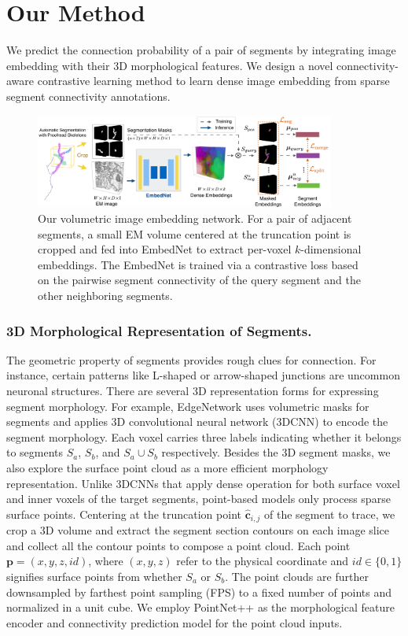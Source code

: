 \section{Our Method}
\label{sec:method}

 
We predict the connection probability of a pair of segments by integrating image embedding with their 3D morphological features. We design a novel connectivity-aware contrastive learning method to learn dense image embedding from sparse segment connectivity annotations.
\begin{figure}[t]
    \centering
    \includegraphics[width=0.88\textwidth]{figs/main.pdf}
    \caption{Our volumetric image embedding network. For a pair of adjacent segments, a small EM volume centered at the truncation point is cropped and fed into EmbedNet to extract per-voxel $k$-dimensional embeddings. The EmbedNet is trained via a contrastive loss based on the pairwise segment connectivity of the query segment and the other neighboring segments.}%
    \label{fig:embedding}
\end{figure}


\subsubsection{3D Morphological Representation of Segments.}
The geometric property of segments provides rough clues for connection. For instance, certain patterns like L-shaped or arrow-shaped junctions are uncommon neuronal structures. 
There are several 3D representation forms for expressing segment morphology. For example, EdgeNetwork \cite{matejek2019biologically} uses volumetric masks for segments and applies 3D convolutional neural network (3DCNN) to encode the segment morphology. 
Each voxel carries three labels indicating whether it belongs to segments $S_a$, $S_b$, and $S_a \cup S_b$ respectively. Besides the 3D segment masks, we also explore the surface point cloud as a more efficient morphology representation. Unlike 3DCNNs that apply dense operation for both surface voxel and inner voxels of the target segments, point-based models only process sparse surface points. Centering at the truncation point ${\hat{\mathbf{c}}}_{i,j}$ of the segment to trace, we crop a 3D volume and extract the segment section contours on each image slice and collect all the contour points to compose a point cloud. 
Each point $\mathbf{p}=(x,y,z, id)$, where $(x,y,z)$ refer to the physical coordinate and $id\in\{0,1\}$ signifies surface points from whether $S_a$ or $S_b$. 
The point clouds are further downsampled by farthest point sampling (FPS) to a fixed number of points and normalized in a unit cube. We employ PointNet++ \cite{PointNet++-NIPS-2017} as the morphological feature encoder and connectivity prediction model for the point cloud inputs.

